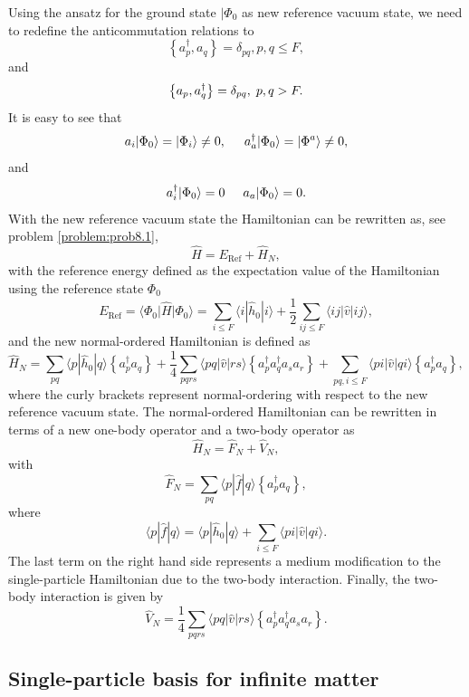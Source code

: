 Using the ansatz for the ground state $\vert \Phi_0$ as new reference
vacuum state, we need to redefine the anticommutation relations to
\[
\left\{a_p^\dagger, a_q \right\}= \delta_{pq}, p, q \leq F,
\]
and
\[
\left\{a_p, a_q^\dagger \right\} = \delta_{pq}, \hspace{0.1cm} p, q > F.
\]
It is easy to see that
\[
        a_i|\Phi_0\rangle = |\Phi_i\rangle\ne 0, \hspace{0.5cm}
        a_a^\dagger|\Phi_0\rangle = |\Phi^a\rangle\ne 0,
\]
and
\[
a_i^\dagger|\Phi_0\rangle = 0 \hspace{0.5cm} a_a|\Phi_0\rangle = 0.
\]
With the new reference vacuum state the Hamiltonian can be rewritten
as, see problem \ref{problem:prob8.1},
\[
\hat{H}=E_{\mathrm{Ref}}+\hat{H}_N,
\]
with the reference energy defined as the expectation value of the
Hamiltonian using the reference state $\Phi_0$
\[
E_{\mathrm{Ref}}=\langle \Phi_0 \vert \hat{H} \vert \Phi_0\rangle =
\sum_{i\le F} \langle i|\hat{h}_0|i\rangle + \frac{1}{2} \sum_{ij\le
  F}\langle ij|\hat{v}|ij\rangle,
\]
and the new normal-ordered Hamiltonian is defined as
\begin{equation}\label{eq:Hnormalorder}
\hat{H}_N = \sum_{pq} \langle p|\hat{h}_0|q\rangle \left\{a^\dagger_p
a_q\right\}+\frac{1}{4} \sum_{pqrs} \langle pq|\hat{v}|rs\rangle
\left\{a^\dagger_p a^\dagger_q a_s a_r\right\}+\sum_{pq,i\le F}
\langle pi|\hat{v}|qi\rangle \left\{a^\dagger_p a_q\right\},
\end{equation}
where the curly brackets represent normal-ordering with respect to the
new reference vacuum state.  The normal-ordered Hamiltonian can be
rewritten in terms of a new one-body operator and a two-body operator
as
\[
\hat{H}_N=\hat{F}_N+\hat{V}_N,
\]
with
\begin{equation}\label{eq:hfn}
\hat{F}_N=\sum_{pq} \langle p|\hat{f}|q\rangle \left\{a^\dagger_pa_q\right\},
\end{equation}
where
\[
\langle p|\hat{f}|q\rangle= \langle p|\hat{h}_0|q\rangle +\sum_{i\le F}
\langle pi|\hat{v}|qi\rangle.
\]
The last term on the right hand side represents a medium modification
to the single-particle Hamiltonian due to the two-body interaction.
Finally, the two-body interaction is given by
\begin{equation}\label{eq:hvn}	     
\hat{V}_N = \frac{1}{4} \sum_{pqrs} \langle pq|\hat{v}|rs\rangle
\left\{a^\dagger_p a^\dagger_q a_s a_r\right\}.
\end{equation}	     

\subsection{Single-particle basis for infinite matter}

